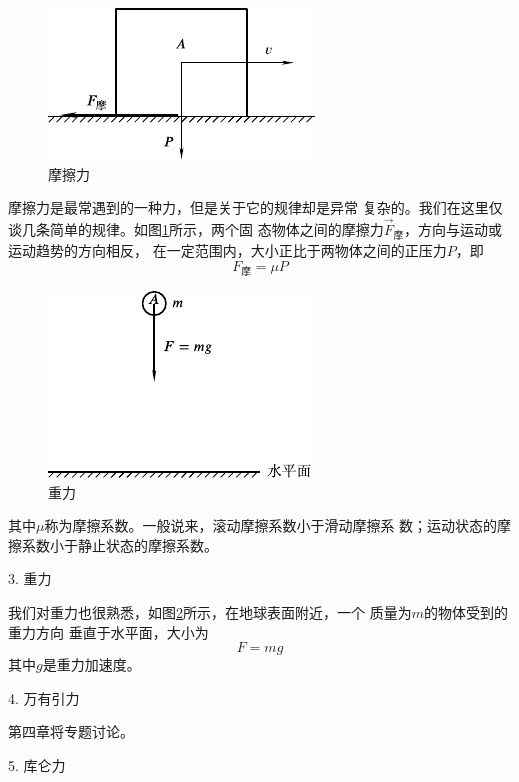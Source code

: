 \begin{figure}
  \includegraphics{figure/fig03.04}
  \caption{摩擦力}
  \label{fig:03.04}
\end{figure}
摩擦力是最常遇到的一种力，但是关于它的规律却是异常
复杂的。我们在这里仅谈几条简单的规律。如图\ref{fig:03.04}所示，两个固
态物体之间的摩擦力$ \vec{F}_\text{摩} $，方向与运动或运动趋势的方向相反，
在一定范围内，大小正比于两物体之间的正压力$ P $，即\vspace{-0.2em}
\begin{equation}\label{eqn:03.04.02}
  F_\text{摩} = \mu P
\end{equation}

\begin{figure}
  \includegraphics{figure/fig03.05}
  \caption{重力}
  \label{fig:03.05}
\end{figure}
\noindent 其中$\mu$称为摩擦系数。一般说来，滚动摩擦系数小于滑动摩擦系
数；运动状态的摩擦系数小于静止状态的摩擦系数。

\textsf{3. 重力}

我们对重力也很熟悉，如图\ref{fig:03.05}所示，在地球表面附近，一个
质量为$ m $的物体受到的重力方向
垂直于水平面，大小为
\begin{equation}\label{eqn:03.04.03}
  F = m g
\end{equation}
其中$ g $是重力加速度。

\textsf{4. 万有引力}

第四章将专题讨论。

\textsf{5. 库仑力}

